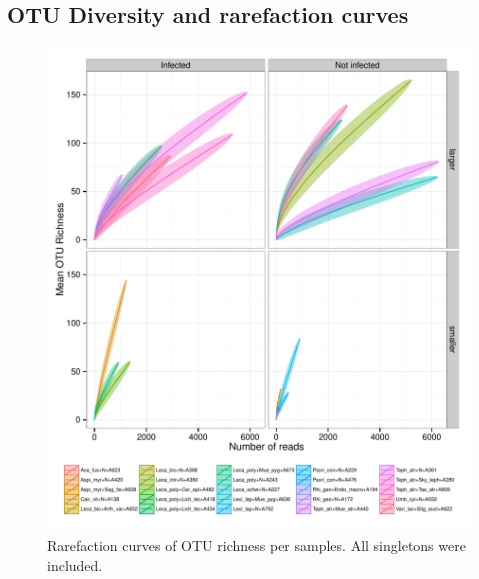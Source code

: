 \documentclass[a4paper, 11]{article}\usepackage[]{graphicx}\usepackage[]{color}
\makeatletter
\def\maxwidth{ %
  \ifdim\Gin@nat@width>\linewidth
    \linewidth
  \else
    \Gin@nat@width
  \fi
}
\newenvironment{knitrout}{}{} %
\makeatother
\begin{document}
\subsection{OTU Diversity and rarefaction curves}
\begin{knitrout}
\color{fgcolor}\begin{figure}[H]
\includegraphics[width=\maxwidth]{figure/rarefact-1} \caption[Rarefaction curves of OTU richness per samples]{Rarefaction curves of OTU richness per samples. All singletons were included.}\label{fig:rarefact}
\end{figure}


\end{knitrout}
%
%
\end{document}
